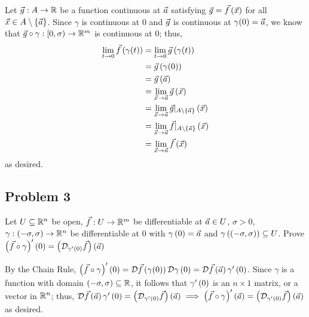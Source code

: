 \documentclass[main.tex]{subfiles}
\begin{document}
\begin{soln}
    Let $\vec{g} : A \to \mathbb R$ be a function continuous at $\vec{a}$ satisfying $\vec{g} =     \vec{f}\left( \vec{x} \right)$ for all $\vec{x} \in A \setminus \left\{ \vec{a} \right\}$. Since $\gamma$ is continuous at $0$ and $\vec{g}$ is continuous at $\gamma(0) = \vec{a}$, we know that $\vec{g}\circ\gamma : [0, \sigma) \to \mathbb R^m$ is continuous at $0$; thus, 
    \begin{align*}
        \lim_{t\to 0} \vec{f}\left( \gamma(t) \right) &= \lim_{t\to 0} \vec{g}\left( \gamma(t) \right) \\
        &= \vec{g}\left( \gamma(0) \right) \\
        &= \vec{g}\left( \vec{a} \right) \\
        &= \lim_{\vec{x}\to \vec{a}} \vec{g}\left( \vec{x} \right) \\
        &= \lim_{\vec{x}\to \vec{a}} \vec{g}|_{A\setminus\left\{ \vec{a} \right\}} \left( \vec{x} \right) \\
        &= \lim_{\vec{x}\to \vec{a}} \vec{f}|_{A\setminus\left\{ \vec{a} \right\}} \left( \vec{x} \right) \\
        &= \lim_{\vec{x}\to \vec{a}} \vec{f}\left( \vec{x} \right)
    \end{align*}
    as desired.
\end{soln}
\eject

\subsection{Problem 3}
\begin{claim}
    Let $U \subseteq \mathbb R^n$ be open, $\vec{f} : U \to \mathbb R^m$ be differentiable at $\vec{a} \in U$, $\sigma > 0$, $\gamma: \left( -\sigma,\sigma \right) \to \mathbb R^n$ be differentiable at 0 with $\gamma\left( 0 \right) = \vec{a}$ and $\gamma\left( \left( -\sigma,\sigma \right) \right) \subseteq U$. Prove $\left( \vec{f} \circ \gamma  \right)'\left( 0 \right) = \left( \mathcal{D}_{\gamma'\left( 0 \right)}\vec{f} \right)\left( \vec{a} \right)$
\end{claim}

\begin{soln}
    By the Chain Rule, $\left( \vec{f} \circ \gamma  \right)'\left( 0 \right) = \mathcal{D}\vec{f}\left( \gamma(0) \right) \mathcal{D}\gamma\left( 0 \right) = \mathcal{D}\vec{f}\left( \vec{a} \right) \gamma'\left( 0 \right)$. Since $\gamma$ is a function with domain $\left( -\sigma, \sigma \right) \subseteq \mathbb R$, it follows that $\gamma'\left( 0 \right)$ is an $n\times 1$ matrix, or a vector in $\mathbb R^n$; thus, $\mathcal{D}\vec{f}\left( \vec{a} \right) \gamma'\left( 0 \right) = \left( \mathcal{D}_{\gamma'\left( 0 \right)}\vec{f} \right)\left( \vec{a} \right) \implies \left( \vec{f} \circ \gamma  \right)'\left( \vec{a} \right) = \left( \mathcal{D}_{\gamma'\left( 0 \right)}\vec{f} \right)\left( \vec{a} \right)$ as desired.
\end{soln}
\eject
\end{document}
